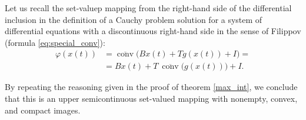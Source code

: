 \documentclass[journal]{IEEEtran}
\begin{document}
\begin{IEEEproof}
    Let us recall the set-valuep mapping from the right-hand side of the differential inclusion in the definition of a Cauchy problem solution for a system of differential equations with a discontinuous right-hand side in the sense of Filippov (formula \eqref{eq:special_conv}):
\[\begin{aligned}
        \varphi(x(t))&=\overline{\operatorname{conv}}\big(Bx(t) + T g(x(t)) + I\big)=\\
        &=Bx(t)+T ~\overline{\operatorname{conv}}\big(g(x(t))\big)+I.
    \end{aligned} \]
   
    By repeating the reasoning given in the proof of theorem \ref{max_int}, we conclude that this is an upper semicontinuous set-valued mapping with nonempty, convex, and compact images. 
    

\end{IEEEproof}
\end{document}
